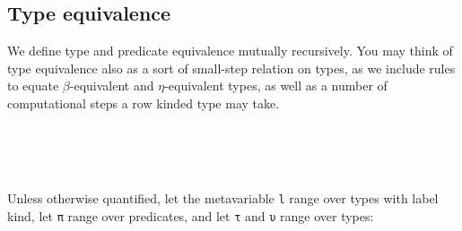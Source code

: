 \documentclass[authoryear, acmsmall, screen, review, nonacm]{acmart}
\begin{document}
\subsection{Type equivalence}

We define type and predicate equivalence mutually recursively. You may think of type equivalence also as a sort of small-step relation on types, as we include rules to equate $\beta$-equivalent and $\eta$-equivalent types, as well as a number of computational steps a row kinded type may take.

\begin{code}%
\>[0]\AgdaSpace{}%
\AgdaSpace{}%
\<%
\\
\>[0]\AgdaSpace{}%
\AgdaSpace{}%
\<%
\\
\>[0]\AgdaSpace{}%
\AgdaSpace{}%
\AgdaSymbol{:}\AgdaSpace{}%
\AgdaSpace{}%
\AgdaSpace{}%
\AgdaOperator{\AgdaInductiveConstructor{R[}}\AgdaSpace{}%
\AgdaSpace{}%
\AgdaOperator{\AgdaInductiveConstructor{]}}\AgdaSpace{}%
\AgdaSpace{}%
\AgdaSpace{}%
\AgdaSpace{}%
\AgdaOperator{\AgdaInductiveConstructor{R[}}\AgdaSpace{}%
\AgdaSpace{}%
\AgdaOperator{\AgdaInductiveConstructor{]}}\AgdaSpace{}%
\AgdaSpace{}%
\<%
\\
\>[0]\AgdaSpace{}%
\AgdaSpace{}%
\AgdaSymbol{:}\AgdaSpace{}%
\AgdaSpace{}%
\AgdaSpace{}%
\AgdaSpace{}%
\AgdaSpace{}%
\AgdaSpace{}%
\AgdaSpace{}%
\AgdaSpace{}%
\AgdaSpace{}%
\<%
\end{code}

Unless otherwise quantified, let the metavariable \verb!l! range over types with label kind, let \verb!π! range over predicates, and let \verb!τ! and \verb!υ! range over types:
\end{document}
